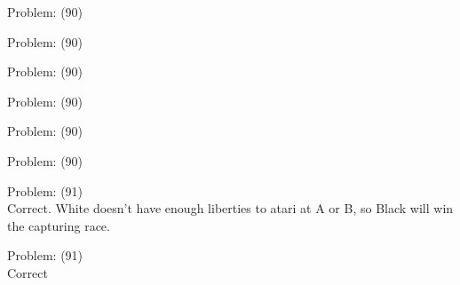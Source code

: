 \documentclass[11pt]{article}
\begin{document}
\begin{minipage}[t]{0.5\textwidth}
  {\centering
  
Problem: (90)\\
  }
\end{minipage}
\begin{minipage}[t]{0.5\textwidth}
  {\centering
  
Problem: (90)\\
  }
\end{minipage}
\begin{minipage}[t]{0.5\textwidth}
  {\centering
  
Problem: (90)\\
  }
\end{minipage}
\begin{minipage}[t]{0.5\textwidth}
  {\centering
  
Problem: (90)\\
  }
\end{minipage}
\begin{minipage}[t]{0.5\textwidth}
  {\centering
  
Problem: (90)\\
  }
\end{minipage}
\begin{minipage}[t]{0.5\textwidth}
  {\centering
  
Problem: (90)\\
  }
\end{minipage}
\begin{minipage}[t]{0.5\textwidth}
  {\centering
  
Problem: (91)\\
Correct. White doesn't have enough liberties to atari at A or B, so Black will win the capturing race.\\
  }
\end{minipage}
\begin{minipage}[t]{0.5\textwidth}
  {\centering
  
Problem: (91)\\
Correct\\
  }
\end{minipage}
\end{document}
